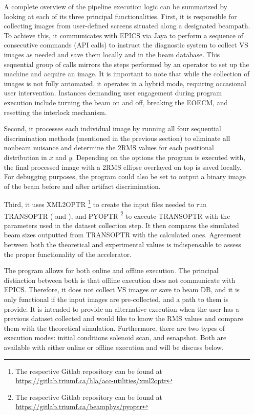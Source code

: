 \documentclass{article}
\begin{document}
A complete overview of the pipeline execution logic can be summarized by looking at each of its three principal functionalities. First, it is responsible for collecting images from user-defined screens situated along a designated beampath. To achieve this, it communicates with EPICS via Jaya to perform a sequence of consecutive commands (API calls) to instruct the diagnostic system to collect VS images as needed and save them locally and in the beam database. This sequential group of calls mirrors the steps performed by an operator to set up the machine and acquire an image. It is important to note that while the collection of images is not fully automated, it operates in a hybrid mode, requiring occasional user intervention. Instances demanding user engagement during program execution include turning the beam on and off, breaking the EOECM, and resetting the interlock mechanism.
    
Second, it processes each individual image by running all four sequential discrimination methods (mentioned in the previous section) to eliminate all nonbeam nuisance and determine the 2RMS values for each positional distribution in $x$ and $y$. Depending on the options the program is executed with, the final processed image with a 2RMS ellipse overlayed on top is saved locally. For debugging purposes, the program could also be set to output a binary image of the beam before and after artifact discrimination.   

Third, it uses XML2OPTR \footnote{The respective Gitlab repository can be found at \url{https://gitlab.triumf.ca/hla/acc-utilities/xml2optr}} to create the input files needed to run TRANSOPTR ( and ), and PYOPTR \footnote{The respective Gitlab repository can be found at \url{https://gitlab.triumf.ca/beamphys/pyoptr}} to execute TRANSOPTR with the parameters used in the dataset collection step. It then compares the simulated beam sizes outputted from TRANSOPTR with the calculated ones. Agreement between both the theoretical and experimental values is indispensable to assess the proper functionality of the accelerator. 

The program allows for both online and offline execution. The principal distinction between both is that offline execution does not communicate with EPICS. Therefore, it does not collect VS images or save to beam DB, and it is only functional if the input images are pre-collected, and a path to them is provide. It is intended to provide an alternative execution when the user has a previous dataset collected and would like to know the RMS values and compare them with the theoretical simulation. Furthermore, there are two types of execution modes: initial conditions solenoid scan, and esnapshot. Both are available with either online or offline execution and will be discuss below. 
\end{document}
